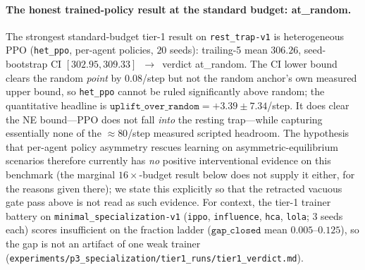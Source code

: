 \documentclass{anvil-paper}
\begin{document}
\paragraph{The honest trained-policy result at the standard budget:
\textsf{at\_random}.}
The strongest standard-budget tier-1 result on \texttt{rest\_trap-v1}
is heterogeneous
PPO (\texttt{het\_ppo}, per-agent policies, $20$ seeds): trailing-5 mean
$306.26$, seed-bootstrap CI $[302.95, 309.33]$~$\to$~verdict
\textsf{at\_random}. The CI lower bound clears the random \emph{point}
by $0.08$/step but not the random anchor's own measured upper bound, so
\texttt{het\_ppo} cannot be ruled significantly above random; the
quantitative headline is
$\texttt{uplift\_over\_random}{=}{+}3.39\pm 7.34$/step. It does clear
the NE bound---PPO does not fall \emph{into} the resting trap---while
capturing essentially none of the ${\approx}80$/step measured scripted
headroom. The hypothesis that per-agent policy asymmetry rescues
learning on asymmetric-equilibrium scenarios therefore currently has
\emph{no} positive interventional evidence on this benchmark (the
marginal $16{\times}$-budget result below does not supply it either,
for the reasons given there); we state
this explicitly so that the retracted vacuous gate pass above is not
read as such evidence. For context, the tier-1 trainer battery on
\texttt{minimal\_specialization-v1} (\texttt{ippo}, \texttt{influence},
\texttt{hca}, \texttt{lola}; $3$ seeds each) scores
\textsf{insufficient} on the fraction ladder
($\texttt{gap\_closed}$ mean $0.005$--$0.125$), so the gap is not an
artifact of one weak trainer
(\texttt{experiments/p3\_specialization/tier1\_runs/tier1\_verdict.md}).
\end{document}

